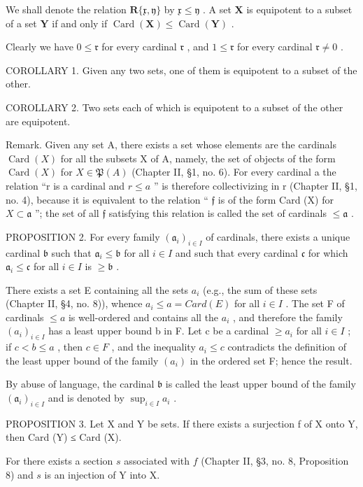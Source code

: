 We shall denote the relation \(\mathbf{R}\{\mathfrak{x},\mathfrak{y}\}\) by \(\mathfrak{x}\leqslant \mathfrak{y}\) . A set \(\mathbf{X}\) is equipotent to a subset of a set \(\mathbf{Y}\) if and only if \(\operatorname{Card}(\mathbf{X})\leqslant \operatorname{Card}(\mathbf{Y})\) .

Clearly we have \(0 \leqslant \mathfrak{r}\) for every cardinal \(\mathfrak{r}\) , and \(1 \leqslant \mathfrak{r}\) for every cardinal \(\mathfrak{r} \neq 0\) .

COROLLARY 1. Given any two sets, one of them is equipotent to a subset of the other.

COROLLARY 2. Two sets each of which is equipotent to a subset of the other are equipotent.

Remark. Given any set A, there exists a set whose elements are the cardinals \(\operatorname{Card}(X)\) for all the subsets X of A, namely, the set of objects of the form \(\operatorname{Card}(X)\) for \(X \in \mathfrak{P}(A)\) (Chapter II, §1, no. 6). For every cardinal a the relation ``r is a cardinal and \(r \leqslant a\) '' is therefore collectivizing in r (Chapter II, §1, no. 4), because it is equivalent to the relation `` \(\mathfrak{f}\) is of the form Card (X) for \(X \subset \mathfrak{a}\) ''; the set of all \(\mathfrak{f}\) satisfying this relation is called the set of cardinals \(\leqslant \mathfrak{a}\) .

PROPOSITION 2. For every family \((\mathfrak{a}_i)_{i\in I}\) of cardinals, there exists a unique cardinal \(\mathfrak{b}\) such that \(\mathfrak{a}_i\leqslant \mathfrak{b}\) for all \(i\in I\) and such that every cardinal \(\mathfrak{c}\) for which \(\mathfrak{a}_i\leqslant \mathfrak{c}\) for all \(i\in I\) is \(\geqslant \mathfrak{b}\) .

There exists a set E containing all the sets \(a_{i}\) (e.g., the sum of these sets (Chapter II, §4, no. 8)), whence \(a_{i} \leqslant a = Card(E)\) for all \(i \in I\) . The set F of cardinals \(\leqslant a\) is well-ordered and contains all the \(a_{i}\) , and therefore the family \((a_{i})_{i \in I}\) has a least upper bound b in F. Let c be a cardinal \(\geqslant a_{i}\) for all \(i \in I\) ; if \(c < b \leqslant a\) , then \(c \in F\) , and the inequality \(a_{i} \leqslant c\) contradicts the definition of the least upper bound of the family \((a_{i})\) in the ordered set F; hence the result.

By abuse of language, the cardinal \(\mathfrak{b}\) is called the least upper bound of the family \((\mathfrak{a}_i)_{i\in I}\) and is denoted by \(\sup_{i\in I}a_i\) .

PROPOSITION 3. Let X and Y be sets. If there exists a surjection f of X onto Y, then Card (Y) ≤ Card (X).

For there exists a section \(s\) associated with \(f\) (Chapter II, §3, no. 8, Proposition 8) and \(s\) is an injection of Y into X.

